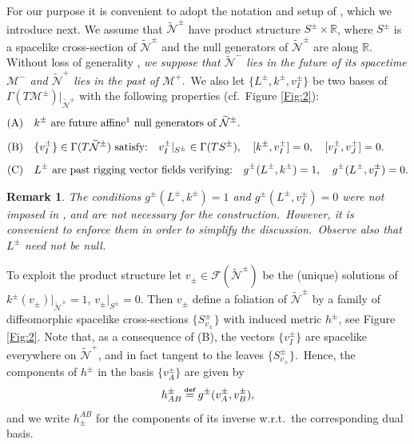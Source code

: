 \documentclass[11pt]{article}
\numberwithin{equation}{section}
\newtheorem{remark}[theorem]{Remark}
\def\defi{{\stackrel{\mbox{\tiny {\textbf{def}}}}{\,\, = \,\, }}}
\def\Fcal{\mathcal F}
\newcommand{\nn}{\nonumber}
\newcommand\N{\mathcal N}
\def\defi{{\stackrel{\mbox{\tiny \textup{\textbf{def}}}}{\,\, = \,\, }}}
\def\Fcal{\mathcal F}
\newcommand{\lp}{\left(}
\newcommand{\rp}{\right)}
\newcommand{\Mp}{\mathcal{M^+}}
\newcommand{\Ml}{\mathcal{M^-}}
\newcommand{\nullhyp}{\widetilde{\N}}
\begin{document}
For our purpose it is convenient to adopt the notation and setup of \cite{manzano2021null}, which we introduce next. We assume that $\nullhyp^{\pm}$ have product structure $S^{\pm} \times \mathbb{R}$, where $S^{\pm}$ is a spacelike cross-section of $\nullhyp^{\pm}$ and the null generators of $\nullhyp^{\pm}$ are along $\mathbb{R}$. 
Without loss of generality \cite{manzano2021null}, \textit{we suppose that   
$\nullhyp^-$ lies in the future of its spacetime $\Ml$ and $\nullhyp^+$  
lies in the past of $\Mp$}.\ We also let $\{ L^{\pm}, k^{\pm}, v_I^{\pm} \}$ be two bases  of $\Gamma\lp T\mathcal{M}^{\pm} \rp\vert_{\nullhyp^{\pm}}$ with the following properties (cf.\ Figure \ref{Fig:2}):
\begin{align}
\nn \text{(A)}\quad & k^{\pm} \text{ are future affine}\footnotemark[1] \text{ null generators of } \nullhyp^{\pm}. \nonumber\\[5pt]
\label{cond:ABC} \text{(B)}\quad & \{v_I^{\pm}\} \in \Gamma(T\nullhyp^{\pm}) \text{ satisfy:} \quad v_I^{\pm}\vert_{S^{\pm}} \in \Gamma(TS^{\pm}),  
\quad [k^{\pm},v_I^{\pm}] = 0,\quad [v_I^{\pm},v_J^{\pm}] = 0. \\[5pt]
\nn \text{(C)}\quad & L^{\pm} \text{ are past rigging vector fields verifying}
\textup{:}  
\quad g^{\pm}(L^{\pm},k^{\pm}) = 1, \quad g^{\pm}(L^{\pm},v_I^{\pm}) = 0.
\end{align}

\setcounter{footnote}{1}

\vspace{-0.8cm}

\begin{remark}
The conditions $g^{\pm}(L^{\pm},k^{\pm}) = 1$ and $g^{\pm}(L^{\pm},v_I^{\pm}) = 0$ were not imposed in \textup{\cite{manzano2021null,manzano2022general,manzano2023matching}}, and are not necessary for the construction.\ However, it is convenient to enforce them in order to simplify the discussion.\ Observe also that $L^{\pm}$ need not be null.
\end{remark}
To exploit the product structure let $v_{\pm}\in\Fcal(\nullhyp^{\pm})$ be the (unique) solutions of $k^{\pm}(v_{\pm})\vert_{\nullhyp^{\pm}}=1$, $v_{\pm} \vert_{S^{\pm}}=0$. Then $v_{\pm}$ define 
a foliation of $\nullhyp^{\pm}$ by a family of diffeomorphic spacelike cross-sections $\{S^{\pm}_{v_{\pm}}\}$ with induced metric $h^{\pm}$, see Figure \ref{Fig:2}. 
Note that, as a consequence of (B), the vectors $\{v_I^{\pm}\}$ are spacelike everywhere on $\nullhyp^+$, and in fact tangent to the leaves $\{S^{\pm}_{v_{\pm}}\}$.\ 
Hence, 
the components of $h^{\pm}$ in the basis $\{v_A^{\pm}\}$ are given by 
\begin{equation}
h^{\pm}_{AB}\defi g^{\pm}(v_A^{\pm},v_B^{\pm}),
\end{equation}
and we write $h_{\pm}^{AB}$ for the components of its inverse w.r.t.\ the corresponding dual basis.
\end{document}
